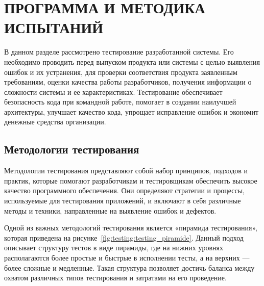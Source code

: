 \usepackage{listings}\section{ПРОГРАММА И МЕТОДИКА ИСПЫТАНИЙ}
\label{sec:testing}


В данном разделе рассмотрено тестирование разработанной системы.
Его необходимо проводить перед выпуском продукта или системы с целью выявления ошибок и их устранения, для проверки соответствия продукта
заявленным требованиям, оценки качества работы разработчиков, получения информации о сложности системы и ее характеристиках.
Тестирование обеспечивает безопасность кода при командной работе, помогает в создании наилучшей
архитектуры, улучшает качество кода, упрощает исправление ошибок и экономит денежные средства организации.

\subsection{Методологии тестирования}
Методологии тестирования представляют собой набор принципов, подходов и практик,
которые помогают разработчикам и тестировщикам обеспечить высокое качество программного обеспечения.
Они определяют стратегии и процессы, используемые для тестирования приложений,
и включают в себя различные методы и техники, направленные на выявление ошибок и дефектов.

Одной из важных методологий тестирования является «пирамида тестирования», которая приведена на рисунке~\ref{fig:testing:testing_piramide}.
Данный подход описывает структуру тестов в виде пирамиды, где на нижних уровнях располагаются более
простые и быстрые в исполнении тесты, а на верхних — более сложные и медленные.
Такая структура позволяет достичь баланса между охватом различных типов тестирования и затратами на его проведение.


